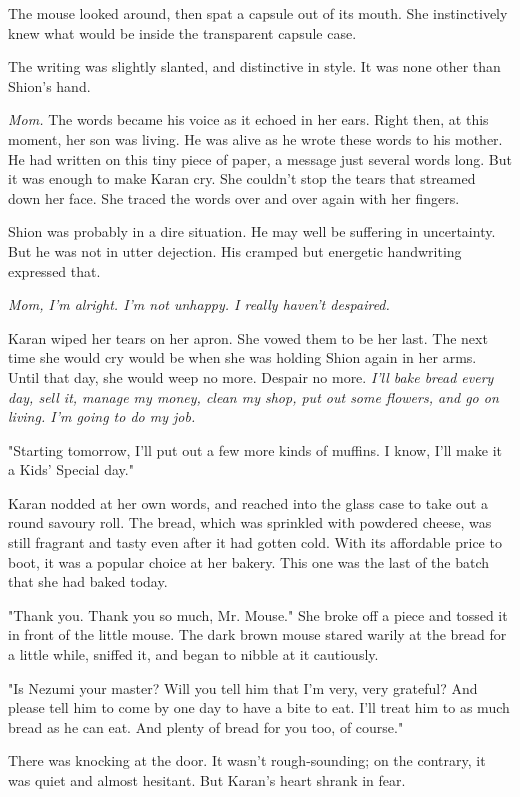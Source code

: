 The mouse looked around, then spat a capsule out of its mouth. She
instinctively knew what would be inside the transparent capsule case.


The writing was slightly slanted, and distinctive in style. It was none
other than Shion's hand.

\emph{Mom.} The words became his voice as it echoed in her ears. Right then, at
this moment, her son was living. He was alive as he wrote these words to
his mother. He had written on this tiny piece of paper, a message just
several words long. But it was enough to make Karan cry. She couldn't
stop the tears that streamed down her face. She traced the words over
and over again with her fingers.

Shion was probably in a dire situation. He may well be suffering in
uncertainty. But he was not in utter dejection. His cramped but
energetic handwriting expressed that.

\emph{Mom, I'm alright. I'm not unhappy. I really haven't despaired.}

Karan wiped her tears on her apron. She vowed them to be her last. The
next time she would cry would be when she was holding Shion again in her
arms. Until that day, she would weep no more. Despair no more. \emph{I'll bake
	bread every day, sell it, manage my money, clean my shop, put out some
	flowers, and go on living. I'm going to do my job.}

"Starting tomorrow, I'll put out a few more kinds of muffins. I know,
I'll make it a Kids' Special day."

Karan nodded at her own words, and reached into the glass case to take
out a round savoury roll. The bread, which was sprinkled with powdered
cheese, was still fragrant and tasty even after it had gotten cold. With
its affordable price to boot, it was a popular choice at her bakery.
This one was the last of the batch that she had baked today.

"Thank you. Thank you so much, Mr. Mouse." She broke off a piece and
tossed it in front of the little mouse. The dark brown mouse stared
warily at the bread for a little while, sniffed it, and began to nibble
at it cautiously.

"Is Nezumi your master? Will you tell him that I'm very, very grateful?
And please tell him to come by one day to have a bite to eat. I'll treat
him to as much bread as he can eat. And plenty of bread for you too, of
course."

There was knocking at the door. It wasn't rough-sounding; on the
contrary, it was quiet and almost hesitant. But Karan's heart shrank in
fear.


